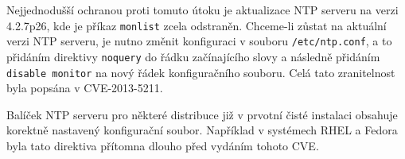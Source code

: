 Nejjednodušší ochranou proti tomuto útoku je aktualizace NTP serveru na verzi 4.2.7p26, kde
je příkaz \texttt{monlist} zcela odstraněn. Chceme-li zůstat na aktuální verzi NTP serveru,
je nutno změnit konfiguraci v souboru \texttt{/etc/ntp.conf}, a to přidáním direktivy
\texttt{noquery} do řádku začínajícího slovy  a následně přidáním
\texttt{disable monitor} na nový řádek konfiguračního souboru. 
Celá tato zranitelnost byla popsána v CVE-2013-5211. %

Balíček NTP serveru pro některé distribuce již v prvotní čisté instalaci obsahuje korektně
nastavený konfigurační soubor. Například v systémech RHEL a Fedora byla tato direktiva
přítomna dlouho před vydáním tohoto CVE. %
